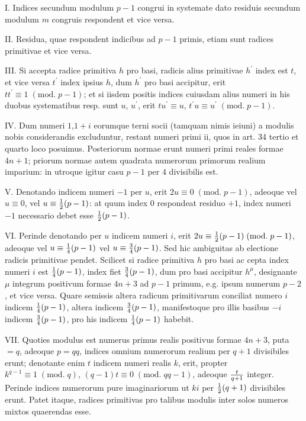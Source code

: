 \documentclass[twoside,12pt]{memoir}
\renewcommand{\pmod}[1]{\;(\textrm{mod.}\;#1)}
\let\oldfrac\frac
\def\frac#1#2{\mathchoice{\tfrac{#1}{#2}}{\oldfrac{#1}{#2}}{\genfrac{}{}{}{2}{#1}{#2\mathstrut}}{\genfrac{}{}{}{3}{#1}{#2\mathstrut}}}
\begin{document}
I. Indices secundum modulum \(p-1\) congrui in systemate dato residuis secundum modulum \(m\) congruis respondent et vice versa.
 
II. Residua, quae respondent indicibus ad \(p-1\) primis, etiam sunt radices primitivae et vice versa.
 
III. Si accepta radice primitiva \(h\) pro basi, radicis alius primitivae \(h^{\prime}\) index est \(t\), et vice versa \(t^{\prime}\) index ipsius \(h\), dum \(h^{\prime}\) pro basi accipitur, erit \(t t^{\prime} \equiv 1\pmod{p-1}\); et si iisdem positis indices cuiusdam alius numeri in his duobus systematibus resp. sunt \(u\), \(u^{\prime}\), erit \(t u^{\prime} \equiv u\), \(t^{\prime} u \equiv u^{\prime}\pmod{p-1}\).
 
IV. Dum numeri \(1\),\(1+i\) eorumque terni socii (tamquam nimis ieiuni) a modulis nobis considerandis excluduntur, restant numeri primi ii, quos in art. 34 tertio et quarto loco posuimus. Posteriorum normae erunt numeri primi reales formae \(4 n+1\); priorum normae autem quadrata numerorum primorum realium imparium: in utroque igitur casu \(p-1\) per \(4\) divisibilis est.

V. Denotando indicem numeri \(-1\) per \(u\), erit \(2 u \equiv 0\pmod{p-1}\), adeoque vel \(u \equiv 0\), vel \(u \equiv \frac{1}{2}(p-1)\): at quum index \(0\) respondeat residuo \(+1\), index numeri \(-1\) necessario debet esse \(\frac{1}{2}(p-1)\).
 
VI. Perinde denotando per \(u\) indicem numeri \(i\), erit \(2 u \equiv \frac{1}{2}(p-1) \pmod{p-1}\), adeoque vel \(u \equiv \frac{1}{4}(p-1)\) vel \(u \equiv \frac{3}{4}(p-1)\). Sed hic ambiguitas ab electione radicis primitivae pendet. Scilicet si radice primitiva \(h\) pro basi ac\pagebreak%
cepta index numeri \(i\) est \(\frac{1}{4}(p-1)\), index fiet \(\frac{3}{4}(p-1)\), dum pro basi accipitur \(h^{\mu}\), designante \(\mu\) integrum positivum formae \(4 n+3\) ad \(p-1\) primum, e.g. ipsum numerum \(p-2\), et vice versa. Quare semissis altera radicum primitivarum conciliat numero \(i\) indicem \(\frac{1}{4}(p-1)\), altera indicem \(\frac{3}{4}(p-1)\), manifestoque pro illis basibus \(-i\) indicem \(\frac{3}{4}(p-1)\), pro his indicem \(\frac{1}{4}(p-1)\) habebit.
 
VII. Quoties modulus est numerus primus realis positivus formae \(4 n+3\), puta \(=q\), adeoque \(p=q q\), indices omnium numerorum realium per \(q+1\) divisibiles erunt; denotante enim \(t\) indicem numeri realis \(k\), erit, propter \(k^{q-1} \equiv 1\pmod{q}\), \((q-1) t \equiv 0\pmod{q q-1}\), adeoque \(\frac{t}{q+1}\) integer. Perinde indices numerorum pure imaginariorum ut \(k i\) per \(\frac{1}{2}(q+1)\) divisibiles erunt. Patet itaque, radices primitivas pro talibus modulis inter solos numeros mixtos quaerendas esse.
 
\end{document}

